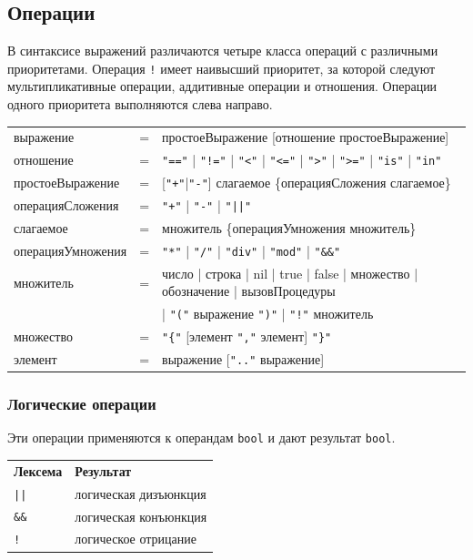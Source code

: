 \documentclass[a4paper,12pt]{article}
\newcommand{\lit}[1]{\texttt{"#1"}}
\begin{document}
    \subsection*{Операции}

    В синтаксисе выражений различаются четыре класса операций с различными приоритетами. Операция \texttt{!} имеет наивысший приоритет, за которой следуют мультипликативные операции, аддитивные операции и отношения. Операции одного приоритета выполняются слева направо.

    \begin{center}
        \begin{tabular}{l c l}
            выражение & = & простоеВыражение [отношение простоеВыражение] \\
            отношение & = & \lit{==} | \lit{!=} | \lit{<} | \lit{<=} | \lit{>} | \lit{>=} | \lit{is} | \lit{in} \\
            простоеВыражение & = & [\lit{+}|\lit{-}] слагаемое \{операцияСложения слагаемое\} \\
            операцияСложения & = & \lit{+} | \lit{-} | \lit{||} \\
            слагаемое & = & множитель \{операцияУмножения множитель\} \\
            операцияУмножения & = & \lit{*} | \lit{/} | \lit{div} | \lit{mod} | \lit{\&\&} \\
            множитель & = & число | строка | nil | true | false | множество | обозначение | вызовПроцедуры \\
            & & | \lit{(} выражение \lit{)} | \lit{!} множитель \\
            множество & = & \lit{\{} [элемент {\lit{,} элемент}] \lit{\}} \\
            элемент & = & выражение [\lit{..} выражение] \\
        \end{tabular}
    \end{center}

    \subsubsection*{Логические операции}

    Эти операции применяются к операндам \texttt{bool} и дают результат \texttt{bool}.\\

    \begin{tabular}{ll}
        \textbf{Лексема} & \textbf{Результат} \\
        \texttt{||} & логическая дизъюнкция \\
        \texttt{\&\&} & логическая конъюнкция \\
        \texttt{!} & логическое отрицание \\
    \end{tabular}\\
\end{document}
